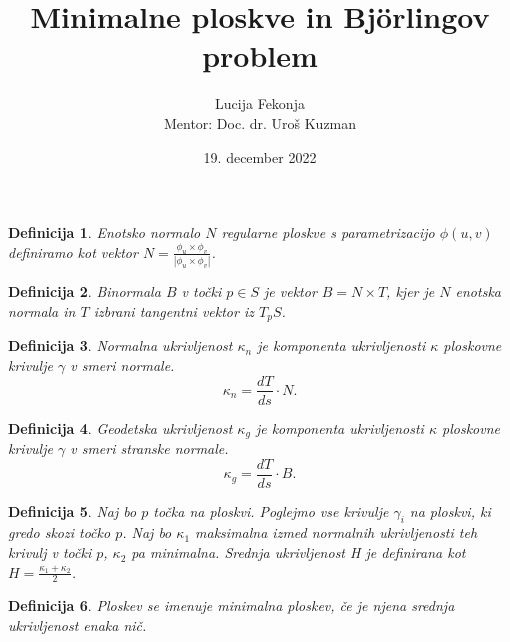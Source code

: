 \documentclass{beamer}
\title{Minimalne ploskve in Björlingov problem}
\author{Lucija Fekonja \\
Mentor: Doc. dr. Uroš Kuzman}
\institute{Fakulteta za matematiko in fiziko \\
Oddelek za matematiko}
\date{19. december 2022}
\newtheorem{definicija}{Definicija}
\begin{document}
\begin{frame}
    \titlepage
\end{frame}

\begin{frame}
    \begin{definicija}
        \emph{Enotsko normalo $N$} regularne ploskve s parametrizacijo $\phi(u, v)$ definiramo kot vektor $N = \frac{\phi_u \times \phi_v}{\left\lvert \phi_u \times \phi_v \right\rvert }$.
    \end{definicija}
    
    \begin{definicija}
        \emph{Binormala $B$} v točki $p \in S$ je vektor $B = N \times T$, kjer je $N$ enotska normala in $T$ izbrani tangentni vektor iz $T_p S$.
    \end{definicija}
\end{frame}
    
\begin{frame}
    \begin{definicija}
        \emph{Normalna ukrivljenost $\kappa_n$} je komponenta ukrivljenosti $\kappa$ ploskovne krivulje $\gamma$ v smeri normale.
        $$ \kappa_n = \frac{dT}{ds} \cdot N. $$
    \end{definicija}
    
    \begin{definicija}
        \emph{Geodetska ukrivljenost $\kappa_g$} je komponenta ukrivljenosti $\kappa$ ploskovne krivulje $\gamma$ v smeri stranske normale.
        $$ \kappa_g = \frac{dT}{ds} \cdot B. $$
    \end{definicija}    
\end{frame}

\begin{frame}
    \begin{definicija}
            Naj bo $p$ točka na ploskvi. Poglejmo vse krivulje $\gamma_i$ na ploskvi, ki gredo skozi točko $p$. Naj bo $\kappa_1$ maksimalna izmed normalnih ukrivljenosti
            teh krivulj v točki $p$, $\kappa_2$ pa minimalna. 
        \emph{Srednja ukrivljenost H} je definirana kot $H = \frac{ \kappa_1 + \kappa_2 }{2}$.
    \end{definicija}

    \begin{definicija}
        Ploskev se imenuje \emph{minimalna ploskev}, če je njena srednja ukrivljenost enaka nič.
    \end{definicija}    
\end{frame}
\end{document}
